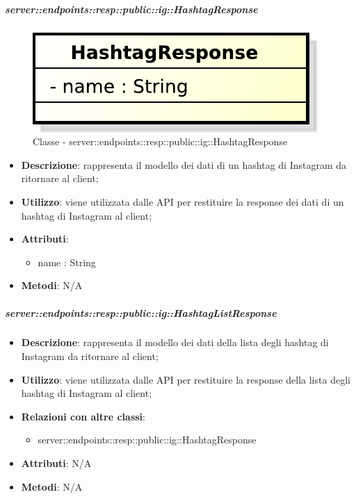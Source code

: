     \subparagraph{server::endpoints::resp::public::ig::HashtagResponse} %
    \label{subp:bdsm_app_server_endpoints_resp_public_ig_hashtagresponse}
	\begin{figure}[!htbp]
		\centering
		\centerline{\includegraphics[scale=0.6]{./images/server/classes/endpoints/ig/hashtag_response.pdf}}
		\caption{Classe - server::endpoints::resp::public::ig::HashtagResponse}
	\end{figure}
    \begin{itemize}
      \item \textbf{Descrizione}: rappresenta il modello dei dati di un hashtag di Instagram da ritornare al client;
      \item \textbf{Utilizzo}: viene utilizzata dalle API per restituire la response dei dati di un hashtag di Instagram al client;

	  \item \textbf{Attributi}:
	  	\begin{itemize}
	  		\item name : String
	  	\end{itemize}
	  \item \textbf{Metodi}: N/A
      \end{itemize}

    \subparagraph{server::endpoints::resp::public::ig::HashtagListResponse} %
    \label{subp:bdsm_app_server_endpoints_resp_public_ig_hashtaglistresponse}
    \begin{itemize}
      \item \textbf{Descrizione}: rappresenta il modello dei dati della lista degli hashtag di Instagram da ritornare al client;
      \item \textbf{Utilizzo}: viene utilizzata dalle API per restituire la response della lista degli hashtag di Instagram al client;
      \item \textbf{Relazioni con altre classi}:
        \begin{itemize}
          \item server::endpoints::resp::public::ig::HashtagResponse
        \end{itemize}
	  \item \textbf{Attributi}: N/A
	  \item \textbf{Metodi}: N/A
      \end{itemize}


